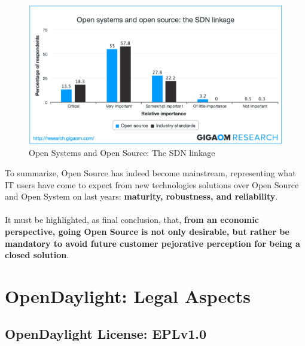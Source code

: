 \documentclass[a4paper, 12pt]{book}
\begin{document}
\begin{center}
 \begin{figure}
 \begin{center}
   \includegraphics[width=15cm]{img/open-source-success-operator-view-00.png}
   \caption{Open Systems and Open Source: The SDN linkage}
   \label{fig:sdn_hype_cyle}
 \end{center}
 \end{figure}
\end{center}
To summarize, Open Source has indeed become mainstream, representing what IT users have come to expect from new technologies solutions over Open Source and Open System on last years: \textbf{maturity, robustness, and reliability}.\\
\\
It must be highlighted, as final conclusion, that, \textbf{from an economic perspective, going Open Source is not only desirable, but rather be mandatory to avoid future customer pejorative perception for being a closed solution}.

\chapter{OpenDaylight: Legal Aspects}
\label{chap:odllegal}

\section{OpenDaylight License: EPLv1.0}
\label{sec:odllicense}
\end{document}
